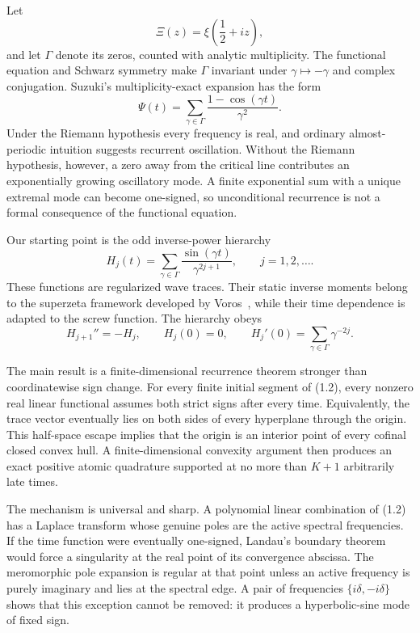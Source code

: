 \documentclass[11pt]{article}
\theoremstyle{remark}
\begin{document}
Let
\[
  \Xi(z)=\xi\!\left(\frac12+iz\right),
\]
and let $\Gamma$ denote its zeros, counted with analytic multiplicity.  The functional equation
and Schwarz symmetry make $\Gamma$ invariant under $\gamma\mapsto-\gamma$ and complex
conjugation.  Suzuki's multiplicity-exact expansion has the form
\[
  \Psi(t)=\sum_{\gamma\in\Gamma}
       \frac{1-\cos(\gamma t)}{\gamma^2}.
  \tag{1.1}
\]
Under the Riemann hypothesis every frequency is real, and ordinary almost-periodic intuition
suggests recurrent oscillation.  Without the Riemann hypothesis, however, a zero away from the
critical line contributes an exponentially growing oscillatory mode.  A finite exponential sum
with a unique extremal mode can become one-signed, so unconditional recurrence is not a formal
consequence of the functional equation.

Our starting point is the odd inverse-power hierarchy
\[
  H_j(t)=\sum_{\gamma\in\Gamma}
       \frac{\sin(\gamma t)}{\gamma^{2j+1}},
  \qquad j=1,2,\ldots.
  \tag{1.2}
\]
These functions are regularized wave traces.  Their static inverse moments belong to the
superzeta framework developed by Voros~\cite{Voros2003,Voros2014}, while their time dependence is
adapted to the screw function.  The hierarchy obeys
\[
  H_{j+1}''=-H_j,\qquad
  H_j(0)=0,\qquad
  H_j'(0)=\sum_{\gamma\in\Gamma}\gamma^{-2j}.
  \tag{1.3}
\]

The main result is a finite-dimensional recurrence theorem stronger than coordinatewise sign
change.  For every finite initial segment of (1.2), every nonzero real linear functional assumes
both strict signs after every time.  Equivalently, the trace vector eventually lies on both sides
of every hyperplane through the origin.  This half-space escape implies that the origin is an
interior point of every cofinal closed convex hull.  A finite-dimensional convexity argument then
produces an exact positive atomic quadrature supported at no more than $K+1$ arbitrarily late
times.

The mechanism is universal and sharp.  A polynomial linear combination of (1.2) has a Laplace
transform whose genuine poles are the active spectral frequencies.  If the time function were
eventually one-signed, Landau's boundary theorem would force a singularity at the real point of
its convergence abscissa.  The meromorphic pole expansion is regular at that point unless an
active frequency is purely imaginary and lies at the spectral edge.  A pair of frequencies
$\{i\delta,-i\delta\}$ shows that this exception cannot be removed: it produces a hyperbolic-sine
mode of fixed sign.
\end{document}

